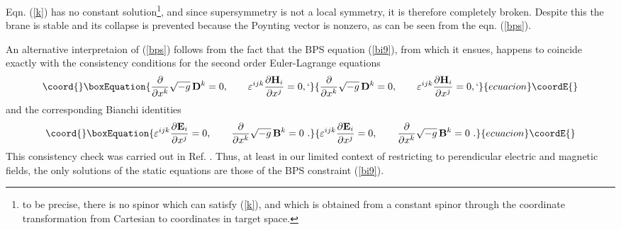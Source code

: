 \documentclass[a4paper,12pt]{article}
\begin{document}
Eqn. (\ref{k}) has no constant solution\footnote[1]{to be precise, there is no spinor which can satisfy (\ref{k}), and which is obtained from a constant spinor through the coordinate transformation from Cartesian to \coordHE{} coordinates in target space.}, and since supersymmetry is not a local symmetry, it is therefore completely broken. Despite this the brane is stable and its collapse is prevented because the Poynting vector is nonzero, as can be seen from the eqn. (\ref{bps}).

An alternative interpretaion of (\ref{bps}) follows from the fact that the BPS equation (\ref{bi9}), from which it ensues, happens to coincide exactly with the consistency conditions for the second order Euler-Lagrange equations
\begin{equation}\coord{}\boxEquation{
\frac{\partial }{\partial x^k}\sqrt{-g}\,{\d}^k=0,\qquad 
{\varepsilon}^{ijk}\frac{\partial {\h}_i}{\partial x^j}=0,
\label{s2}`
}{
\frac{\partial }{\partial x^k}\sqrt{-g}\,{\d}^k=0,\qquad 
{\varepsilon}^{ijk}\frac{\partial {\h}_i}{\partial x^j}=0,
`
}{ecuacion}\coordE{}\end{equation}
and the corresponding Bianchi identities
\begin{equation}\coord{}\boxEquation{
{\varepsilon}^{ijk}\frac{\partial {\e}_i}{\partial x^j}=0,\qquad 
\frac{\partial }{\partial x^k}\sqrt{-g}\,{\m}^k=0\ .
\label{s3}
}{
{\varepsilon}^{ijk}\frac{\partial {\e}_i}{\partial x^j}=0,\qquad 
\frac{\partial }{\partial x^k}\sqrt{-g}\,{\m}^k=0\ .
}{ecuacion}\coordE{}\end{equation}
This consistency check was carried out in Ref. \cite{dual}.
Thus, at least in our limited context of restricting to perendicular electric and magnetic fields, the only solutions of the static equations are those of the BPS constraint (\ref{bi9}).
 
\end{document}
